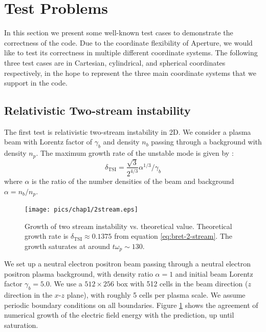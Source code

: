 \section{Test Problems}
\label{sec:test-problems}

In this section we present some well-known test cases to demonstrate the
correctness of the code. Due to the coordinate flexibility of Aperture, we would
like to test its correctness in multiple different coordinate systems. The
following three test cases are in Cartesian, cylindrical, and spherical
coordinates respectively, in the hope to represent the three main coordinate
systems that we support in the code.

\subsection{Relativistic Two-stream instability}
\label{sec:test-two-stream}

The first test is relativistic two-stream instability in 2D. We consider a
plasma beam with Lorentz factor of $\gamma_{b}$ and density $n_{b}$ passing
through a background with density $n_{p}$. The maximum growth rate of the
unstable mode is given by \citep[see e.g.][]{bret_collective_2004}:
\begin{equation}
  \label{eq:bret-2-stream}
  \delta_\mathrm{TSI} = \frac{\sqrt{3}}{2^{4/3}}\alpha^{1/3}/\gamma_{b}
\end{equation}
where $\alpha$ is the ratio of the number densities of the beam and background
$\alpha = n_{b}/n_{p}$.

\begin{figure}[h]
  \centering
  \texttt{[image: pics/chap1/2stream.eps]}
  \caption[Growth of two stream instability vs. theoretical value.]{Growth of
    two stream instability vs. theoretical value. Theoretical growth rate is
    $\delta_\mathrm{TSI}\approx 0.1375$ from equation \eqref{eq:bret-2-stream}.
    The growth saturates at around $t\omega_{p}\sim 130$.}
  \label{fig:test-2stream}
\end{figure}

We set up a neutral electron positron beam passing through a neutral electron
positron plasma background, with density ratio $\alpha = 1$ and initial beam
Lorentz factor $\gamma_{b} = 5.0$. We use a $512\times 256$ box with 512 cells
in the beam direction ($z$ direction in the $x$-$z$ plane), with roughly 5 cells
per plasma scale. We assume periodic boundary conditions on all boundaries.
Figure \ref{fig:test-2stream} shows the agreement of numerical growth of the
electric field energy with the prediction, up until saturation.


